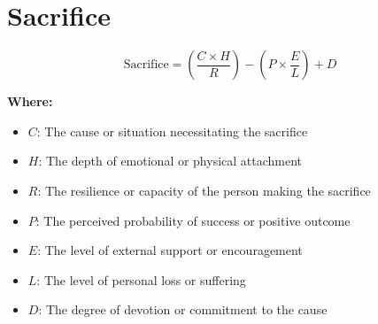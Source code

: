 \chapter{Sacrifice}

\begin{equation}
\text{Sacrifice} = \left( \frac{C \times H}{R} \right) - \left( P \times \frac{E}{L} \right) + D
\end{equation}

\textbf{Where:}

\begin{itemize}
    \item $C$: The cause or situation necessitating the sacrifice
    \item $H$: The depth of emotional or physical attachment
    \item $R$: The resilience or capacity of the person making the sacrifice
    \item $P$: The perceived probability of success or positive outcome
    \item $E$: The level of external support or encouragement
    \item $L$: The level of personal loss or suffering
    \item $D$: The degree of devotion or commitment to the cause
\end{itemize}
